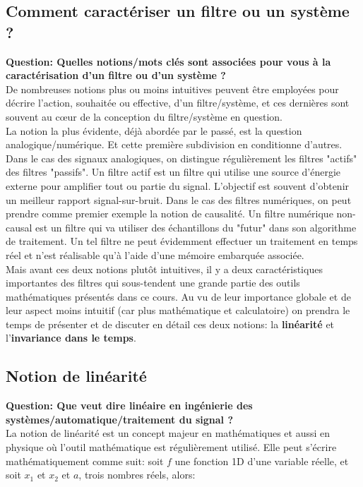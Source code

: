 \documentclass[11pt,a4paper]{article}
\begin{document}
\subsection{Comment caractériser un filtre ou un système ?}  
\textbf{Question: Quelles notions/mots clés sont associées pour vous à la caractérisation d'un filtre ou d'un système ?}\\

De nombreuses notions plus ou moins intuitives peuvent être employées pour décrire l'action, souhaitée ou effective, d'un filtre/système, et ces dernières sont souvent au cœur de la conception du filtre/système en question.\\

La notion la plus évidente, déjà abordée par le passé, est la question analogique/numérique. Et cette première subdivision en conditionne d'autres. Dans le cas des signaux analogiques, on distingue régulièrement les filtres "actifs" des filtres "passifs". Un filtre actif est un filtre qui utilise une source d'énergie externe pour amplifier tout ou partie du signal. L'objectif est souvent d'obtenir un meilleur rapport signal-sur-bruit. Dans le cas des filtres numériques, on peut prendre comme premier exemple la notion de causalité. Un filtre numérique non-causal est un filtre qui va utiliser des échantillons du "futur" dans son algorithme de traitement. Un tel filtre ne peut évidemment effectuer un traitement en temps réel et n'est réalisable qu'à l'aide d'une mémoire embarquée associée.\\

Mais avant ces deux notions plutôt intuitives, il y a deux caractéristiques importantes des filtres qui sous-tendent une grande partie des outils mathématiques présentés dans ce cours. Au vu de leur importance globale et de leur aspect moins intuitif (car plus mathématique et calculatoire) on prendra le temps de présenter et de discuter en détail ces deux notions: la \textbf{linéarité} et l'\textbf{invariance dans le temps}.

\subsection{Notion de linéarité}
\textbf{Question: Que veut dire linéaire en ingénierie des systèmes/automatique/traitement du signal ?}\\

La notion de linéarité est un concept majeur en mathématiques et aussi en physique où l'outil mathématique est régulièrement utilisé. Elle peut s'écrire mathématiquement comme suit: soit $f$ une fonction 1D d'une variable réelle,  et soit $x_1$ et $x_2$ et $a$, trois nombres réels, alors:
\end{document}
